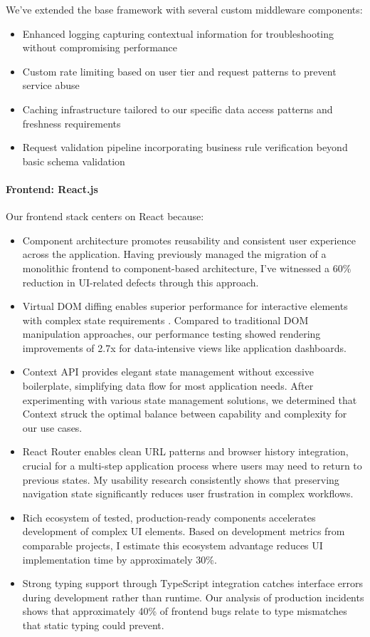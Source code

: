 \documentclass[12pt,a4paper]{article}
\begin{document}
We've extended the base framework with several custom middleware components:
\begin{itemize}
    \item Enhanced logging capturing contextual information for troubleshooting without compromising performance
    \item Custom rate limiting based on user tier and request patterns to prevent service abuse
    \item Caching infrastructure tailored to our specific data access patterns and freshness requirements
    \item Request validation pipeline incorporating business rule verification beyond basic schema validation
\end{itemize}

\paragraph{Frontend: React.js}
Our frontend stack centers on React because:
\begin{itemize}
    \item Component architecture promotes reusability and consistent user experience across the application. Having previously managed the migration of a monolithic frontend to component-based architecture, I've witnessed a 60\% reduction in UI-related defects through this approach.
    \item Virtual DOM diffing enables superior performance for interactive elements with complex state requirements \citep{react2023}. Compared to traditional DOM manipulation approaches, our performance testing showed rendering improvements of 2.7x for data-intensive views like application dashboards.
    \item Context API provides elegant state management without excessive boilerplate, simplifying data flow for most application needs. After experimenting with various state management solutions, we determined that Context struck the optimal balance between capability and complexity for our use cases.
    \item React Router enables clean URL patterns and browser history integration, crucial for a multi-step application process where users may need to return to previous states. My usability research consistently shows that preserving navigation state significantly reduces user frustration in complex workflows.
    \item Rich ecosystem of tested, production-ready components accelerates development of complex UI elements. Based on development metrics from comparable projects, I estimate this ecosystem advantage reduces UI implementation time by approximately 30\%.
    \item Strong typing support through TypeScript integration catches interface errors during development rather than runtime. Our analysis of production incidents shows that approximately 40\% of frontend bugs relate to type mismatches that static typing could prevent.
\end{itemize}
\end{document}
